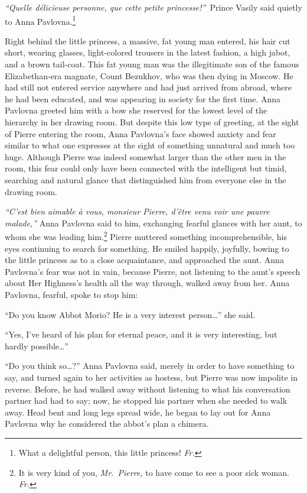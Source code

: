 \textit{``Quelle d\'elicieuse personne, que cette petite
  princesse!''}~Prince Vasily said quietly to Anna
Pavlovna.\footnote{What a delightful person, this little princess!
  \textit{Fr.}} %

Right behind the little princess, a massive, fat young man entered,
his hair cut short, wearing glasses, light-colored trousers in the
latest fashion, a high jabot, and a brown tail-coat. This fat young
man was the illegitimate son of the famous Elizabethan-era magnate,
Count Bezukhov, who was then dying in Moscow. He had still not entered
service anywhere and had just arrived from abroad, where he had been
educated, and was appearing in society for the first time. Anna
Pavlovna greeted him with a bow she reserved for the lowest level of
the hierarchy in her drawing room. But despite this low type of
greeting, at the sight of Pierre entering the room, Anna Pavlovna's
face showed anxiety and fear similar to what one expresses at the
sight of something unnatural and much too huge. Although Pierre was
indeed somewhat larger than the other men in the room, this fear could
only have been connected with the intelligent but timid, searching and
natural glance that distinguished him from everyone else in the
drawing room.

\textit{``C'est bien aimable \`a vous, \emph{monsieur Pierre,}
  d'\^etre venu voir une pauvre malade,''} Anna Pavlovna said to him,
exchanging fearful glances with her aunt, to whom she was leading
him.\footnote{It is very kind of you, \emph{Mr.~Pierre,} to have come
  to see a poor sick woman. \textit{Fr.}} Pierre muttered something
incomprehensible, his eyes continuing to search for something. He
smiled happily, joyfully, bowing to the little princess as to a close
acquaintance, and approached the aunt. Anna Pavlovna's fear was not in
vain, because Pierre, not listening to the aunt's speech about Her
Highness's health all the way through, walked away from her. Anna
Pavlovna, fearful, spoke to stop him: %

``Do you know Abbot Morio? He is a very interest person\ldots{}'' she
said. %

``Yes, I've heard of his plan for eternal peace, and it is very
interesting, but hardly possible\ldots{}'' %

``Do you think so\ldots{}?'' Anna Pavlovna said, merely in order to
have something to say, and turned again to her activities as hostess,
but Pierre was now impolite in reverse. Before, he had walked away
without listening to what his conversation partner had had to say;
now, he stopped his partner when she needed to walk away. Head bent
and long legs spread wide, he began to lay out for Anna Pavlovna why
he considered the abbot's plan a chimera. %

